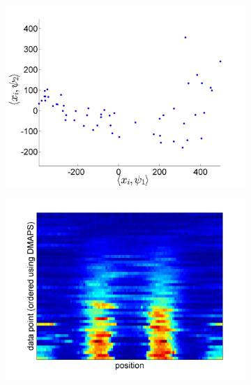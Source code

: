 \documentclass[10pt]{article}
\begin{document}
\begin{figure}[H]
\begin{subfigure}{0.3\textwidth}
\includegraphics[width=\textwidth]{coeff_12_new}
\caption{}
\label{subfig:PCA_12}
\end{subfigure}
\begin{subfigure}{0.3\textwidth}
\includegraphics[width=\textwidth]{data_ordered_DMAPS}
\caption{}
\end{subfigure}
\begin{subfigure}{0.3\textwidth}

\end{subfigure}
\end{figure}
\end{document}
